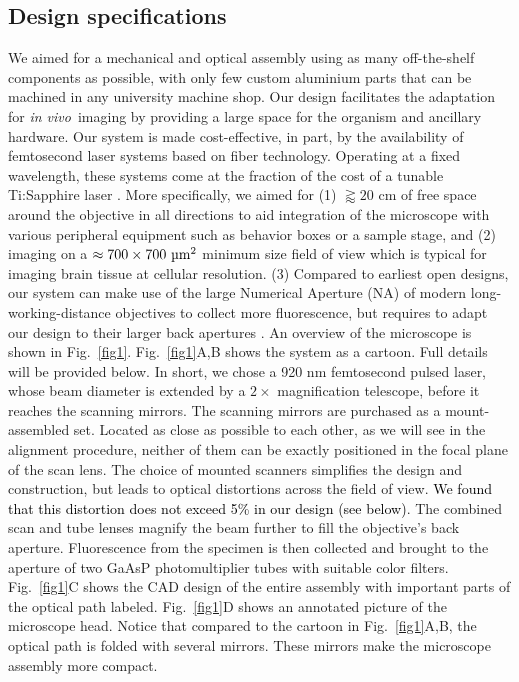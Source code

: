 \documentclass[10pt,letterpaper]{article}
\newcommand{\invivo}{\textit{in vivo}~}
\begin{document}
\subsection*{Design specifications}
We aimed for a mechanical and optical assembly using as many off-the-shelf components as possible, with only few custom aluminium parts that can be machined in any university machine shop. Our design  facilitates the adaptation for \invivo imaging by providing a large space for the organism and ancillary hardware. Our system is made cost-effective, in part, by the availability of femtosecond laser systems based on fiber technology. Operating at a fixed wavelength, these systems come at the fraction of the cost of a tunable Ti:Sapphire laser \cite{Bueno2019}.\newline
More specifically, we aimed for (1) $\gtrapprox20\text{ cm}$ of free space around the objective in all directions to aid integration of the microscope with various peripheral equipment such as behavior boxes or a sample stage, and (2) imaging on a  $\approx 700\times 700\text{ \textmu m}^2$ minimum size field of view which is typical for imaging brain tissue at cellular resolution. (3) Compared to earliest open designs\cite{Rosenegger2014, Mayrhofer2015}, our system can make use of the large Numerical Aperture (NA) of  modern long-working-distance objectives to collect more fluorescence, but requires to adapt our design to their larger back apertures \cite{Janelia2024}.\newline
An overview of the microscope is shown in Fig.~\ref{fig1}. Fig.~\ref{fig1}A,B shows the system as a cartoon. Full details will be provided below. In short, we chose a 920 nm femtosecond pulsed laser, whose beam diameter is extended by a $2\times$ magnification telescope, before it reaches the scanning mirrors. The scanning mirrors are purchased as a mount-assembled set. Located as close as possible to each other, as we will see in the alignment procedure, neither of them can be exactly positioned in the focal plane of the scan lens. The choice of mounted scanners simplifies the design and construction, but leads to optical distortions across the field of view. \textcolor{black}{We found that this distortion does not exceed 5\% in our design (see below)}. The combined scan and tube lenses magnify the beam further to fill the objective's back aperture. Fluorescence from the specimen is then collected and brought to the aperture of two GaAsP photomultiplier tubes with suitable color filters. Fig.~\ref{fig1}C shows the CAD design of the entire assembly with important parts of the optical path labeled. Fig.~\ref{fig1}D shows an annotated picture of the microscope head. Notice that compared to the cartoon in Fig.~\ref{fig1}A,B, the optical path is folded with several mirrors. These mirrors make the microscope assembly more compact.
\end{document}
